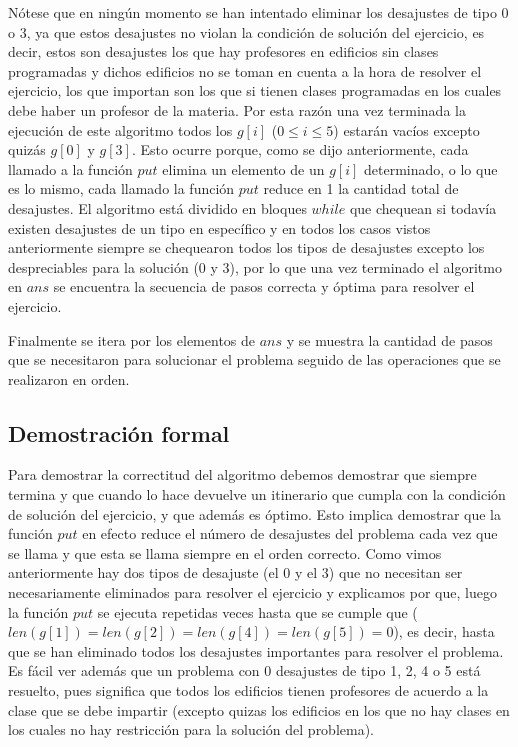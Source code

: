 \documentclass[11pt]{article}
\begin{document}
    Nótese que en ningún momento se han intentado eliminar los desajustes de tipo 0 o 3, ya que estos desajustes
    no violan la condición de solución del ejercicio, es decir, estos son desajustes los que hay profesores en
    edificios sin clases programadas y dichos edificios no se toman en cuenta a la hora de resolver el ejercicio,
    los que importan son los que si tienen clases programadas en los cuales debe haber un profesor de la materia.
    Por esta razón una vez terminada la ejecución de este algoritmo todos los $g[i]$ ($0 \leq i \leq 5$) estarán
    vacíos excepto quizás $g[0]$ y $g[3]$. Esto ocurre porque, como se dijo anteriormente, cada llamado a la función
    $put$ elimina un elemento de un $g[i]$ determinado, o lo que es lo mismo, cada llamado la función $put$ reduce
    en 1 la cantidad total de desajustes. El algoritmo está dividido en bloques $while$ que chequean si todavía
    existen desajustes de un tipo en específico y en todos los casos vistos anteriormente siempre se chequearon todos
    los tipos de desajustes excepto los despreciables para la solución (0 y 3), por lo que una vez terminado el algoritmo
    en $ans$ se encuentra la secuencia de pasos correcta y óptima para resolver el ejercicio.

    Finalmente se itera por los elementos de $ans$ y se muestra la cantidad de pasos que se necesitaron para solucionar
    el problema seguido de las operaciones que se realizaron en orden.

    \subsection{Demostración formal}
    Para demostrar la correctitud del algoritmo debemos demostrar que siempre termina y que cuando lo hace devuelve un
    itinerario que cumpla con la condición de solución del ejercicio, y que además es óptimo. Esto implica demostrar que
    la función $put$ en efecto reduce el número de desajustes del problema cada vez que se llama y que esta se llama siempre
    en el orden correcto. Como vimos anteriormente hay dos tipos de desajuste (el 0 y el 3) que no necesitan ser
    necesariamente eliminados para resolver el ejercicio y explicamos por que, luego la función $put$ se ejecuta repetidas
    veces hasta que se cumple que ($len(g[1]) = len(g[2]) = len(g[4]) = len(g[5]) = 0$), es decir, hasta que se han
    eliminado todos los desajustes importantes para resolver el problema. Es fácil ver además que un problema con 0 desajustes
    de tipo 1, 2, 4 o 5 está resuelto, pues significa que todos los edificios tienen profesores de acuerdo a la clase que
    se debe impartir (excepto quizas los edificios en los que no hay clases en los cuales no hay restricción para
    la solución del problema).
\end{document}
